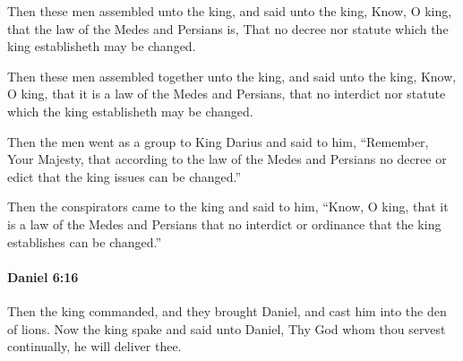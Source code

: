 			Then these men assembled unto the king, and said unto the king, Know, O king, that the law of the Medes and Persians is, That no decree nor statute which the king establisheth may be changed.

			\begin{versebox}
					\item[BHS] 
					\item[LXX] 
					\item[ASV] Then these men assembled together unto the king, and said unto the king, Know, O king, that it is a law of the Medes and Persians, that no interdict nor statute which the king establisheth may be changed.
					\item[NIV] Then the men went as a group to King Darius and said to him, “Remember, Your Majesty, that according to the law of the Medes and Persians no decree or edict that the king issues can be changed.”
					\item[NRSV] Then the conspirators came to the king and said to him, “Know, O king, that it is a law of the Medes and Persians that no interdict or ordinance that the king establishes can be changed.”
			\end{versebox}

		\paragraph{Daniel 6:16} %
			\label{DANIEL-6-16}

			Then the king commanded, and they brought Daniel, and cast him into the den of lions. Now the king spake and said unto Daniel, Thy God whom thou servest continually, he will deliver thee.

